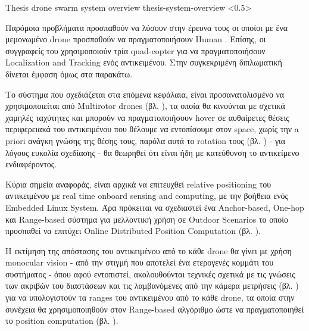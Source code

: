 %
{Thesis drone swarm system overview}%
{thesis-system-overview}%
<0.5>

Παρόμοια προβλήματα προσπαθούν να λύσουν στην έρευνα τους \cite{theo-human-motion} οι οποίοι με ένα μεμονωμένο drone προσπαθούν να πραγματοποιήσουν Human . Επίσης, οι συγγραφείς του \cite{theo-swarm-localiza-and-track-object} χρησιμοποιούν τρία quad-copter για να πραγματοποιήσουν Localization and Tracking ενός αντικειμένου. Στην συγκεκριμένη διπλωματική δίνεται έμφαση όμως στα παρακάτω.

Το σύστημα που σχεδιάζεται στα επόμενα κεφάλαια, είναι προσανατολισμένο να χρησιμοποιείται από Multirotor
drones (βλ. ), τα οποία θα κινούνται με σχετικά χαμηλές ταχύτητες και μπορούν να πραγματοποιήσουν hover σε αυθαίρετες θέσεις περιφερειακά του
αντικειμένου που θέλουμε να εντοπίσουμε στον  space, χωρίς την a priori ανάγκη γνώσης της θέσης τους, 
παρόλα αυτά το rotation τους (βλ. ) - για λόγους ευκολία σχεδίασης - θα θεωρηθεί ότι είναι ήδη με κατεύθυνση
το αντικείμενο ενδιαφέροντος.

Κύρια σημεία αναφοράς, είναι αρχικά να επιτευχθεί relative positioning του αντικειμένου με real time onboard sensing and computing, με την βοήθεια ενός Embedded Linux System.
Άρα πρόκειται να σχεδιαστεί ένα Anchor-based, One-hop και Range-based σύστημα για μελλοντική χρήση σε Outdoor Scenarios το οποίο 
προσπαθεί να επιτύχει Online Distributed Position Computation (βλ. ).

Η εκτίμηση της απόστασης του αντικειμένου από το κάθε drone θα γίνει με χρήση monocular
vision - από την στιγμή που αποτελεί ένα ετερογενές κομμάτι του συστήματος - όπου αφού εντοπιστεί, ακολουθούνται τεχνικές σχετικά με τις γνώσεις των ακριβών του διαστάσεων και τις λαμβανόμενες από την κάμερα μετρήσεις (βλ. ) για να υπολογιστούν τα ranges
του αντικειμένου από το κάθε drone, τα οποία στην συνέχεια θα χρησιμοποιηθούν στον Range-based αλγόριθμο ώστε να πραγματοποιηθεί το position computation (βλ. ).
